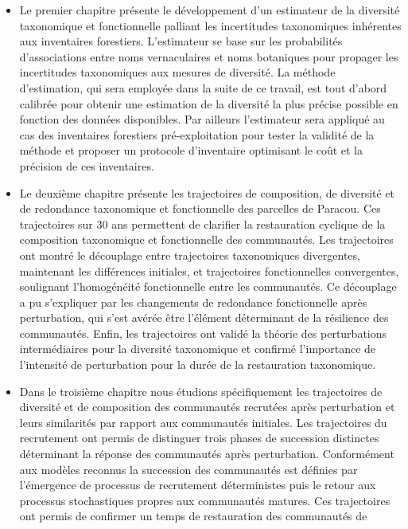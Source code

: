 \documentclass[
  11pt,
  french,
  A4paper,
  extrafontsizes,onecolumn,openright
  ]{memoir}
\begin{document}
\begin{itemize}
\item
  Le premier chapitre présente le développement d'un estimateur de la
  diversité taxonomique et fonctionnelle palliant les incertitudes
  taxonomiques inhérentes aux inventaires forestiers. L'estimateur se
  base sur les probabilités d'associations entre noms vernaculaires et
  noms botaniques pour propager les incertitudes taxonomiques aux
  mesures de diversité. La méthode d'estimation, qui sera employée dans
  la suite de ce travail, est tout d'abord calibrée pour obtenir une
  estimation de la diversité la plus précise possible en fonction des
  données disponibles. Par ailleurs l'estimateur sera appliqué au cas
  des inventaires forestiers pré-exploitation pour tester la validité de
  la méthode et proposer un protocole d'inventaire optimisant le coût et
  la précision de ces inventaires.
\item
  Le deuxième chapitre présente les trajectoires de composition, de
  diversité et de redondance taxonomique et fonctionnelle des parcelles
  de Paracou. Ces trajectoires sur 30 ans permettent de clarifier la
  restauration cyclique de la composition taxonomique et fonctionnelle
  des communautés. Les trajectoires ont montré le découplage entre
  trajectoires taxonomiques divergentes, maintenant les différences
  initiales, et trajectoires fonctionnelles convergentes, soulignant
  l'homogénéité fonctionnelle entre les communautés. Ce découplage a pu
  s'expliquer par les changements de redondance fonctionnelle après
  perturbation, qui s'est avérée être l'élément déterminant de la
  résilience des communautés. Enfin, les trajectoires ont validé la
  théorie des perturbations intermédiaires pour la diversité taxonomique
  et confirmé l'importance de l'intensité de perturbation pour la durée
  de la restauration taxonomique.
\item
  Dans le troisième chapitre nous étudions spécifiquement les
  trajectoires de diversité et de composition des communautés recrutées
  après perturbation et leurs similarités par rapport aux communautés
  initiales. Les trajectoires du recrutement ont permis de distinguer
  trois phases de succession distinctes déterminant la réponse des
  communautés après perturbation. Conformément aux modèles reconnus la
  succession des communautés est définies par l'émergence de processus
  de recrutement déterministes puis le retour aux processus
  stochastiques propres aux communautés matures. Ces trajectoires ont
  permis de confirmer un temps de restauration des communautés de

\end{itemize}
\end{document}
